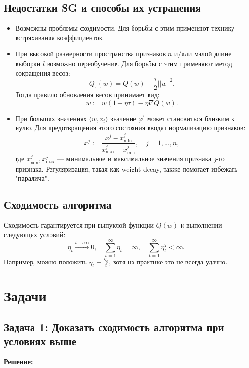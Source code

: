 \subsection*{Недостатки SG и способы их устранения}
\begin{itemize}
    \item Возможны проблемы сходимости. Для борьбы с этим применяют технику встряхивания коэффициентов.
    \item При высокой размерности пространства признаков \( n \) и/или малой длине выборки \( l \) возможно переобучение. Для борьбы с этим применяют метод сокращения весов:
    $$ Q_{\tau}(w) = Q(w) + \frac{\tau}{2}||w||^2. $$
    Тогда правило обновления весов принимает вид:
    $$ w := w(1 - \eta \tau) - \eta \nabla Q(w). $$
    \item При больших значениях \( \langle w, x_i \rangle \) значение \( \varphi^\prime \) может становиться близким к нулю. Для предотвращения этого состояния вводят нормализацию признаков:
    $$ x^j := \frac{x^j - x_{\min}^j}{x_{\max}^j - x_{\min}^j}, \quad j = 1, \dots, n, $$
    где \( x_{\min}^j, x_{\max}^j \) — минимальное и максимальное значения признака \( j \)-го признака. Регуляризация, такая как weight decay, также помогает избежать "паралича".
\end{itemize}

\subsection*{Сходимость алгоритма}
Сходимость гарантируется при выпуклой функции \( Q(w) \) и выполнении следующих условий:
$$ \eta_t \xrightarrow{t \to \infty} 0, \quad \sum_{t=1}^{\infty} \eta_t = \infty, \quad \sum_{t=1}^{\infty} \eta_t^2 < \infty. $$
Например, можно положить \( \eta_t = \frac{\eta_0}{t} \), хотя на практике это не всегда удачно.

\section*{Задачи}

\subsection*{Задача 1: Доказать сходимость алгоритма при условиях выше}

\textbf{Решение:}

